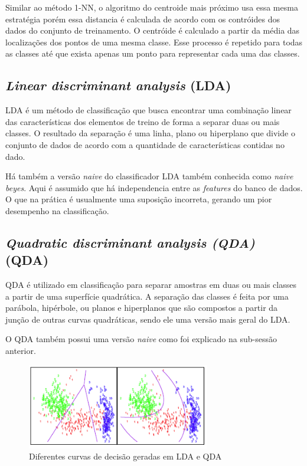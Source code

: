 \documentclass[paper=a4, fontsize=11pt]{scrartcl}
\numberwithin{equation}{section}		%
\numberwithin{figure}{section}			%
\numberwithin{table}{section}				%
\begin{document}
Similar ao método 1-NN, o algoritmo do centroide mais próximo usa essa mesma estratégia porém essa distancia é calculada de acordo com os contróides dos dados do conjunto de treinamento. O centróide é calculado a partir da média das localizações dos pontos de uma mesma classe. Esse processo é repetido para todas as classes até que exista apenas um ponto para representar cada uma das classes.

\subsection{\textit{Linear discriminant analysis} (LDA)}

LDA é um método de classificação que busca encontrar uma combinação linear das características dos elementos de treino de forma a separar duas ou mais classes. O resultado da separação é uma linha, plano ou hiperplano que divide o conjunto de dados de acordo com a quantidade de características contidas no dado.

Há também a versão \textit{naive} do classificador LDA também conhecida como \textit{naive beyes}. Aqui é assumido que há independencia entre as \textit{features} do banco de dados. O que na prática é usualmente uma suposição incorreta, gerando um pior desempenho na classificação.

\subsection{\textit{Quadratic discriminant analysis (QDA)} (QDA)}

QDA é utilizado em classificação para separar amostras em duas ou mais classes a partir de uma superfície quadrática. A separação das classes é feita por uma parábola, hipérbole, ou planos e hiperplanos que são compostos a partir da junção de outras curvas quadráticas, sendo ele uma versão mais geral do LDA.

O QDA também possui uma versão \textit{naive} como foi explicado na sub-sessão anterior.

\begin{figure}[h]
    \includegraphics[width=8cm]{img/LDAQDA.png}
    \centering
    \caption{Diferentes curvas de decisão geradas em LDA e QDA}
    \label{fig:ldaqda}
\end{figure}
\end{document}
